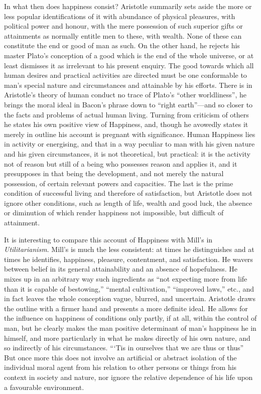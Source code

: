 In what then does happiness consist? Aristotle summarily sets aside the more or
less popular identifications of it with abundance of physical pleasures, with
political power and honour, with the mere possession of such superior gifts or
attainments as normally entitle men to these, with wealth. None of these can
constitute the end or good of man as such. On the other hand, he rejects his
master Plato’s conception of a good which is the end of the whole
universe, or at least dismisses it as irrelevant to his present enquiry. The
good towards which all human desires and practical activities are directed must
be one conformable to man’s special nature and circumstances and
attainable by his efforts. There is in Aristotle’s theory of human
conduct no trace of Plato’s “other worldliness”, he brings
the moral ideal in Bacon’s phrase down to “right
earth”—and so closer to the facts and problems of actual human
living. Turning from criticism of others he states his own positive view of
Happiness, and, though he avowedly states it merely in outline his account is
pregnant with significance. Human Happiness lies in activity or energising, and
that in a way peculiar to man with his given nature and his given
circumstances, it is not theoretical, but practical: it is the activity not of
reason but still of a being who possesses reason and applies it, and it
presupposes in that being the development, and not merely the natural
possession, of certain relevant powers and capacities. The last is the prime
condition of successful living and therefore of satisfaction, but Aristotle
does not ignore other conditions, such as length of life, wealth and good luck,
the absence or diminution of which render happiness not impossible, but
difficult of attainment.

It is interesting to compare this account of Happiness with Mill’s in
\emph{Utilitarianism}. Mill’s is much the less consistent: at times he
distinguishes and at times he identifies, happiness, pleasure, contentment, and
satisfaction. He wavers between belief in its general attainability and an
absence of hopefulness. He mixes up in an arbitrary way such ingredients as
“not expecting more from life than it is capable of bestowing,”
“mental cultivation,” “improved laws,” etc., and in
fact leaves the whole conception vague, blurred, and uncertain. Aristotle draws
the outline with a firmer hand and presents a more definite ideal. He allows
for the influence on happiness of conditions only partly, if at all, within the
control of man, but he clearly makes the man positive determinant of
man’s happiness he in himself, and more particularly in what he makes
directly of his own nature, and so indirectly of his circumstances.
“‘Tis in ourselves that we are thus or thus” But once more
this does not involve an artificial or abstract isolation of the individual
moral agent from his relation to other persons or things from his context in
society and nature, nor ignore the relative dependence of his life upon a
favourable environment.

